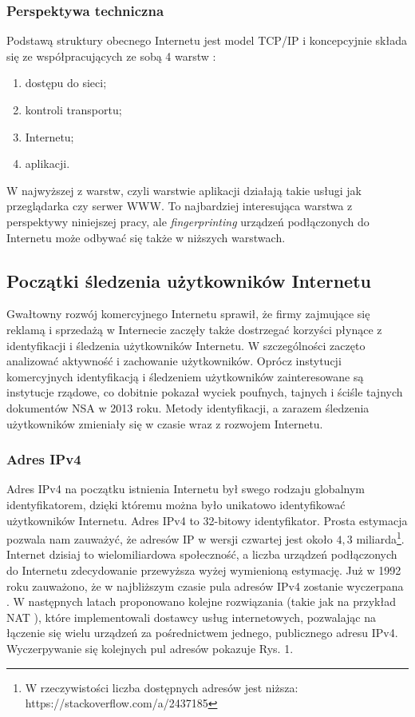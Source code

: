 \subsubsection{Perspektywa techniczna}
Podstawą struktury obecnego Internetu jest model TCP/IP i koncepcyjnie składa
się ze współpracujących ze sobą 4 warstw \cite{kahn1974protocol}:
\begin{enumerate}
	\item dostępu do sieci;
	\item kontroli transportu;
	\item Internetu;
	\item aplikacji.
\end{enumerate}
W najwyższej z warstw, czyli warstwie aplikacji działają takie usługi jak
przeglądarka czy serwer WWW. To najbardziej interesująca warstwa z perspektywy
niniejszej pracy, ale \emph{fingerprinting} urządzeń podłączonych do Internetu
może odbywać się także w niższych warstwach. %

\subsection{Początki śledzenia użytkowników Internetu}
Gwałtowny rozwój komercyjnego Internetu sprawił, że firmy zajmujące się reklamą
i sprzedażą w Internecie zaczęły także dostrzegać korzyści płynące z
identyfikacji i śledzenia użytkowników Internetu. W szczególności zaczęto
analizować aktywność i zachowanie użytkowników. Oprócz instytucji komercyjnych
identyfikacją i śledzeniem użytkowników zainteresowane są instytucje rządowe, co
dobitnie pokazał wyciek poufnych, tajnych i ściśle tajnych dokumentów NSA w 2013
roku. Metody identyfikacji, a zarazem śledzenia użytkowników zmieniały się w
czasie wraz z rozwojem Internetu.

\subsubsection{Adres IPv4}
Adres IPv4 na początku istnienia Internetu był swego rodzaju globalnym
identyfikatorem, dzięki któremu można było unikatowo identyfikować użytkowników
Internetu. Adres IPv4 to 32-bitowy identyfikator. Prosta estymacja pozwala nam
zauważyć, że adresów IP w wersji czwartej jest około \(4,3\) miliarda\footnote{W
	rzeczywistości liczba dostępnych adresów jest niższa:
https://stackoverflow.com/a/2437185}. Internet dzisiaj to wielomiliardowa
społeczność, a liczba urządzeń podłączonych do Internetu zdecydowanie przewyższa
wyżej wymienioną estymację. Już w 1992 roku zauważono, że w najbliższym czasie
pula adresów IPv4 zostanie wyczerpana \cite{fuller1992supernetting}. W
następnych latach proponowano kolejne rozwiązania (takie jak na przykład NAT
\cite{egevang1994ip}), które implementowali dostawcy usług internetowych,
pozwalając na łączenie się wielu urządzeń za pośrednictwem jednego, publicznego
adresu IPv4. Wyczerpywanie się kolejnych pul adresów pokazuje Rys. 1.

